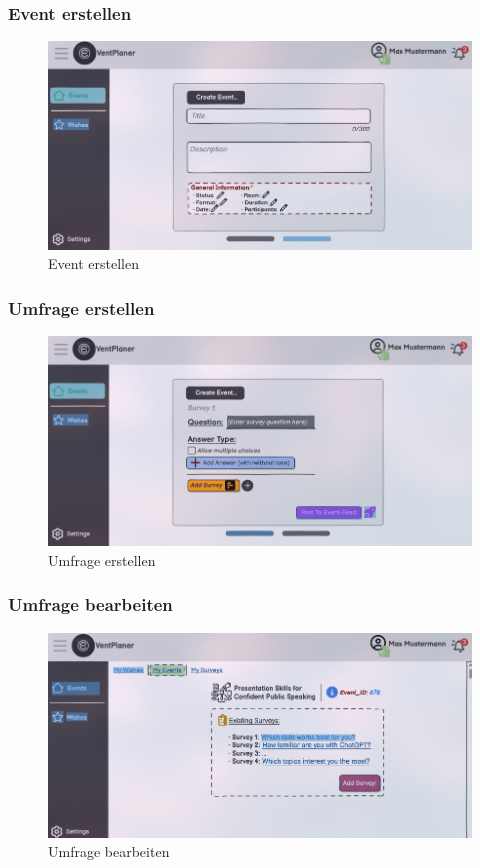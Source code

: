 \documentclass[a4paper,12pt]{article}
\begin{document}
\subsubsection{Event erstellen}
\begin{figure}[H]
    \centering
    \includegraphics[width=1\textwidth]{Abbildungen/events/create_event.png}
    \caption{Event erstellen}
    \label{fig:create_event}
  \end{figure}
\subsubsection{Umfrage erstellen}
\begin{figure}[H]
    \centering
    \includegraphics[width=1\textwidth]{Abbildungen/events/create_survey.png}
    \caption{Umfrage erstellen}
    \label{fig:create_survey}
  \end{figure}
\subsubsection{Umfrage bearbeiten}
\begin{figure}[H]
    \centering
    \includegraphics[width=1\textwidth]{Abbildungen/events/edit_survey.png}
    \caption{Umfrage bearbeiten}
    \label{fig:edit_survey}
  \end{figure}
\end{document}
